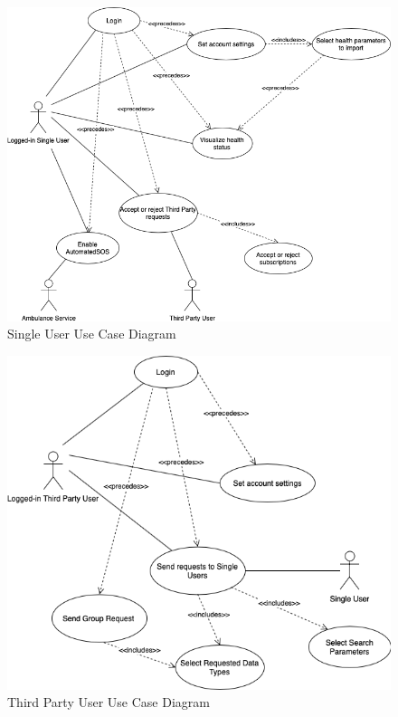 \documentclass[titlepage]{article}
\begin{document}
		\begin{figure}[H]
  			\includegraphics[width=\linewidth]{Diagrammi/SingleUserUseCase.png}
  			\caption{Single User Use Case Diagram}
 			 \label{fig:SingleUserUseCase}
		\end{figure}
			
		\begin{figure}[H]
  			\includegraphics[width=\linewidth]{Diagrammi/ThirdPartyUseCase.png}
  			\caption{Third Party User Use Case Diagram}
 			 \label{fig:ThirdPartyUseCase}
		\end{figure}
\end{document}
